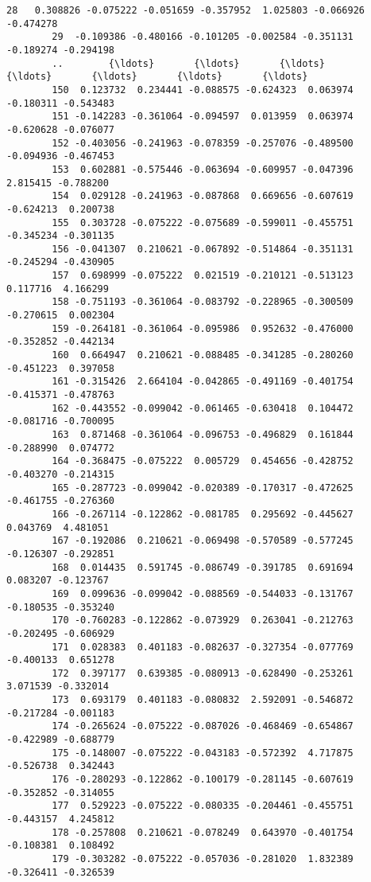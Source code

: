 \documentclass[11pt]{article}
\begin{document}
\begin{Verbatim}[commandchars=\\\{\}]
        28   0.308826 -0.075222 -0.051659 -0.357952  1.025803 -0.066926 -0.474278   
        29  -0.109386 -0.480166 -0.101205 -0.002584 -0.351131 -0.189274 -0.294198   
        ..        {\ldots}       {\ldots}       {\ldots}       {\ldots}       {\ldots}       {\ldots}       {\ldots}   
        150  0.123732  0.234441 -0.088575 -0.624323  0.063974 -0.180311 -0.543483   
        151 -0.142283 -0.361064 -0.094597  0.013959  0.063974 -0.620628 -0.076077   
        152 -0.403056 -0.241963 -0.078359 -0.257076 -0.489500 -0.094936 -0.467453   
        153  0.602881 -0.575446 -0.063694 -0.609957 -0.047396  2.815415 -0.788200   
        154  0.029128 -0.241963 -0.087868  0.669656 -0.607619 -0.624213  0.200738   
        155  0.303728 -0.075222 -0.075689 -0.599011 -0.455751 -0.345234 -0.301135   
        156 -0.041307  0.210621 -0.067892 -0.514864 -0.351131 -0.245294 -0.430905   
        157  0.698999 -0.075222  0.021519 -0.210121 -0.513123  0.117716  4.166299   
        158 -0.751193 -0.361064 -0.083792 -0.228965 -0.300509 -0.270615  0.002304   
        159 -0.264181 -0.361064 -0.095986  0.952632 -0.476000 -0.352852 -0.442134   
        160  0.664947  0.210621 -0.088485 -0.341285 -0.280260 -0.451223  0.397058   
        161 -0.315426  2.664104 -0.042865 -0.491169 -0.401754 -0.415371 -0.478763   
        162 -0.443552 -0.099042 -0.061465 -0.630418  0.104472 -0.081716 -0.700095   
        163  0.871468 -0.361064 -0.096753 -0.496829  0.161844 -0.288990  0.074772   
        164 -0.368475 -0.075222  0.005729  0.454656 -0.428752 -0.403270 -0.214315   
        165 -0.287723 -0.099042 -0.020389 -0.170317 -0.472625 -0.461755 -0.276360   
        166 -0.267114 -0.122862 -0.081785  0.295692 -0.445627  0.043769  4.481051   
        167 -0.192086  0.210621 -0.069498 -0.570589 -0.577245 -0.126307 -0.292851   
        168  0.014435  0.591745 -0.086749 -0.391785  0.691694  0.083207 -0.123767   
        169  0.099636 -0.099042 -0.088569 -0.544033 -0.131767 -0.180535 -0.353240   
        170 -0.760283 -0.122862 -0.073929  0.263041 -0.212763 -0.202495 -0.606929   
        171  0.028383  0.401183 -0.082637 -0.327354 -0.077769 -0.400133  0.651278   
        172  0.397177  0.639385 -0.080913 -0.628490 -0.253261  3.071539 -0.332014   
        173  0.693179  0.401183 -0.080832  2.592091 -0.546872 -0.217284 -0.001183   
        174 -0.265624 -0.075222 -0.087026 -0.468469 -0.654867 -0.422989 -0.688779   
        175 -0.148007 -0.075222 -0.043183 -0.572392  4.717875 -0.526738  0.342443   
        176 -0.280293 -0.122862 -0.100179 -0.281145 -0.607619 -0.352852 -0.314055   
        177  0.529223 -0.075222 -0.080335 -0.204461 -0.455751 -0.443157  4.245812   
        178 -0.257808  0.210621 -0.078249  0.643970 -0.401754 -0.108381  0.108492   
        179 -0.303282 -0.075222 -0.057036 -0.281020  1.832389 -0.326411 -0.326539   
        

\end{Verbatim}
\end{document}
